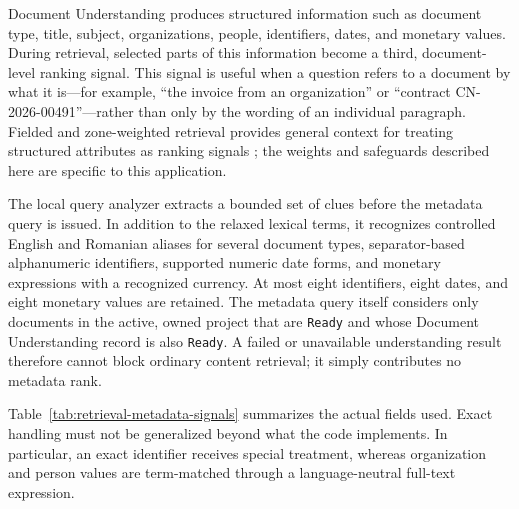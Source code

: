 Document Understanding produces structured information such as document type, title, subject, organizations, people, identifiers, dates, and monetary values. During retrieval, selected parts of this information become a third, document-level ranking signal. This signal is useful when a question refers to a document by what it is---for example, ``the invoice from an organization'' or ``contract CN-2026-00491''---rather than only by the wording of an individual paragraph. Fielded and zone-weighted retrieval provides general context for treating structured attributes as ranking signals \cite{Manning2008IR}; the weights and safeguards described here are specific to this application.

The local query analyzer extracts a bounded set of clues before the metadata query is issued. In addition to the relaxed lexical terms, it recognizes controlled English and Romanian aliases for several document types, separator-based alphanumeric identifiers, supported numeric date forms, and monetary expressions with a recognized currency. At most eight identifiers, eight dates, and eight monetary values are retained. The metadata query itself considers only documents in the active, owned project that are \texttt{Ready} and whose Document Understanding record is also \texttt{Ready}. A failed or unavailable understanding result therefore cannot block ordinary content retrieval; it simply contributes no metadata rank.

Table~\ref{tab:retrieval-metadata-signals} summarizes the actual fields used. Exact handling must not be generalized beyond what the code implements. In particular, an exact identifier receives special treatment, whereas organization and person values are term-matched through a language-neutral full-text expression.

